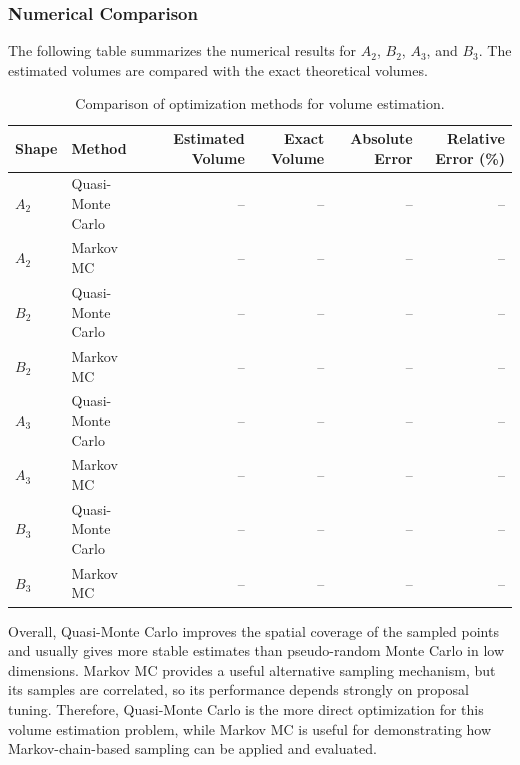 \subsubsection{Numerical Comparison}

The following table summarizes the numerical results for $A_2$, $B_2$, $A_3$, and $B_3$. The estimated volumes are compared with the exact theoretical volumes.

\begin{table}[h]
\centering
\caption{Comparison of optimization methods for volume estimation.}
\label{tab:optimization_results}
\begin{tabular}{l l r r r r}
\hline
Shape & Method & Estimated Volume & Exact Volume & Absolute Error & Relative Error (\%) \\
\hline
$A_2$ & Quasi-Monte Carlo & -- & -- & -- & -- \\
$A_2$ & Markov MC & -- & -- & -- & -- \\
$B_2$ & Quasi-Monte Carlo & -- & -- & -- & -- \\
$B_2$ & Markov MC & -- & -- & -- & -- \\
$A_3$ & Quasi-Monte Carlo & -- & -- & -- & -- \\
$A_3$ & Markov MC & -- & -- & -- & -- \\
$B_3$ & Quasi-Monte Carlo & -- & -- & -- & -- \\
$B_3$ & Markov MC & -- & -- & -- & -- \\
\hline
\end{tabular}
\end{table}

Overall, Quasi-Monte Carlo improves the spatial coverage of the sampled points and usually gives more stable estimates than pseudo-random Monte Carlo in low dimensions. Markov MC provides a useful alternative sampling mechanism, but its samples are correlated, so its performance depends strongly on proposal tuning. Therefore, Quasi-Monte Carlo is the more direct optimization for this volume estimation problem, while Markov MC is useful for demonstrating how Markov-chain-based sampling can be applied and evaluated.
